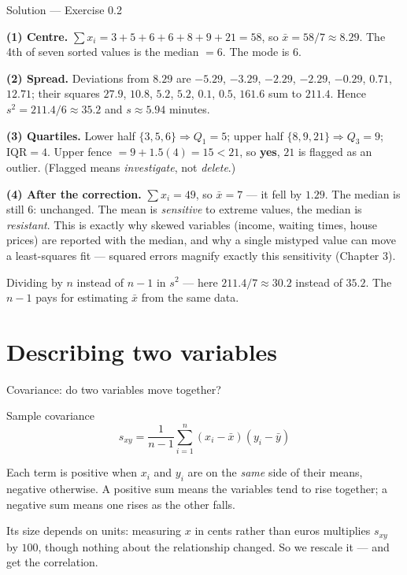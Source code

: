 \documentclass[aspectratio=169,11pt]{beamer}
\begin{document}
\begin{frame}{Solution --- Exercise 0.2}
  \begin{solutionbox}
    \textbf{(1) Centre.} $\sum x_i = 3+5+6+6+8+9+21 = 58$, so
    $\bar x = 58/7 \approx 8.29$. The 4th of seven sorted values is the
    median $= 6$. The mode is $6$.

    \textbf{(2) Spread.} Deviations from $8.29$ are $-5.29$, $-3.29$, $-2.29$,
    $-2.29$, $-0.29$, $0.71$, $12.71$; their squares $27.9$, $10.8$, $5.2$,
    $5.2$, $0.1$, $0.5$, $161.6$ sum to $211.4$. Hence
    $s^2 = 211.4/6 \approx 35.2$ and $s \approx 5.94$ minutes.

    \textbf{(3) Quartiles.} Lower half $\{3,5,6\} \Rightarrow Q_1 = 5$; upper
    half $\{8,9,21\} \Rightarrow Q_3 = 9$; $\mathrm{IQR} = 4$. Upper fence
    $= 9 + 1.5(4) = 15 < 21$, so \textbf{yes}, $21$ is flagged as an outlier.
    (Flagged means \emph{investigate}, not \emph{delete}.)

    \textbf{(4) After the correction.} $\sum x_i = 49$, so $\bar x = 7$ ---
    it fell by $1.29$. The median is still $6$: unchanged. The mean is
    \emph{sensitive} to extreme values, the median is \emph{resistant}. This
    is exactly why skewed variables (income, waiting times, house prices)
    are reported with the median, and why a single mistyped value can move a
    least-squares fit --- squared errors magnify exactly this sensitivity
    (Chapter 3).
  \end{solutionbox}
  \begin{mistake}
    Dividing by $n$ instead of $n-1$ in $s^2$ ---
    here $211.4/7 \approx 30.2$ instead of $35.2$. The $n-1$ pays for
    estimating $\bar x$ from the same data.
  \end{mistake}
\end{frame}


\section{Describing two variables}

\begin{frame}{Covariance: do two variables move together?}
  \begin{block}{Sample covariance}
    \[
      s_{xy} = \frac{1}{n-1}\sum_{i=1}^{n}(x_i - \bar x)(y_i - \bar y)
    \]
  \end{block}
  \begin{readme}
    Each term is positive when $x_i$ and $y_i$ are on the \emph{same} side of
    their means, negative otherwise. A positive sum means the variables tend
    to rise together; a negative sum means one rises as the other falls.
  \end{readme}
  \begin{takeaway}
    Its size depends on units: measuring $x$ in cents rather than euros
    multiplies $s_{xy}$ by $100$, though nothing about the relationship
    changed. So we rescale it --- and get the correlation.
  \end{takeaway}
\end{frame}
\end{document}
